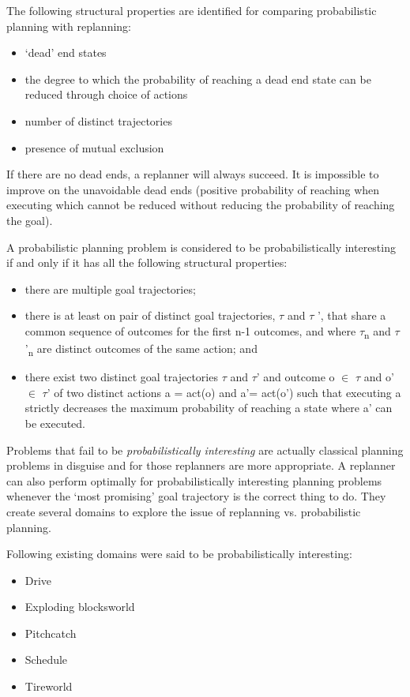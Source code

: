 \documentclass[runningheads,a4paper]{llncs}
\begin{document}
The following structural properties are identified for comparing probabilistic planning with replanning:
\begin{itemize}
	\item `dead' end states
	\item the degree to which the probability of reaching a dead end state can be reduced through choice of actions
	\item number of distinct trajectories
	\item presence of mutual exclusion
\end{itemize}

If there are no dead ends, a replanner will always succeed. It is impossible to improve on the unavoidable dead ends (positive probability of reaching when executing which cannot be reduced without reducing the probability of reaching the goal).


A probabilistic planning problem is considered to be probabilistically interesting if and only if it has all the following structural properties:

\begin{itemize}
	\item there are multiple goal trajectories;
	\item there is at least on pair of distinct goal trajectories, $\tau$ and $\tau$ ', that share a common sequence of outcomes for the first n-1 outcomes, and where $\tau$\textsubscript{n} and $\tau$'\textsubscript{n} are distinct outcomes of the same action; and
	\item there exist two distinct goal trajectories $\tau$ and $\tau$' and outcome o $\in$ $\tau$ and o' $\in$ $\tau$' of two distinct actions a = act(o) and a'= act(o') such that executing a strictly decreases the maximum probability of reaching a state where a' can be executed.
\end{itemize}

Problems that fail to be \emph{probabilistically interesting} are actually classical planning problems in disguise and for those replanners are more appropriate. A replanner can also perform optimally for probabilistically interesting planning problems whenever the `most promising' goal trajectory is the correct thing to do. They create several domains to explore the issue of replanning vs\@. probabilistic planning.

Following existing domains were said to be probabilistically interesting:
\begin{itemize}
	\item Drive
	\item Exploding blocksworld
	\item Pitchcatch
	\item Schedule
	\item Tireworld
\end{itemize}
\end{document}
